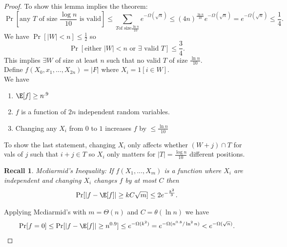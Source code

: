 \documentclass[a4paper]{article}
\newtheorem{rec}[thm]{Recall}
\begin{document}
\begin{proof}
    To show this lemma implies the theorem:
    \[
    \Pr\left [ \text{any $T$ of size $\frac{\log n}{10}$ is valid} \right ]\leq \sum_{T \text{of size} \frac{\ln n}{10}} e^{-\Omega(\sqrt{n})}\leq (4n)^{\frac{\ln n}{10}} e^{-\Omega(\sqrt{n})}=e^{-\Omega(\sqrt{n})}\leq \frac{1}{4}
    .\] 
    We have $\Pr[|W|<n]\leq \frac{1}{2}$ so 
    \[
    \Pr[ \text{either $|W|<n$ or $\exists$ valid $T$}]\leq \frac{3}{4}
    .\] 
    This implies $\exists W$ of size at least $n$ such that no valid $T$ of size $\frac{\ln n}{10}$.\\
    Define $f(X_0,x_1,...,X_{2n})=|F|$ where $X_i=1[i\in W]$. \\
    We have 
    \begin{enumerate}
        \item $\E[f]\geq n^{.9}$
        \item $f$ is a function of $2n$ independent random variables.
        \item Changing any $X_i$ from $0$ to $1$ increases $f$ by $\leq \frac{\ln n}{10}$
    \end{enumerate}
    To show the last statement, changing $X_i$ only affects whether $(W+j)\cap T$ for vals of $j$ such that $i+j\in T$ so $X_i$ only matters for $|T|= \frac{\log n}{10}$ different positions. 
    \begin{rec}
        Mcdiarmid's Inequality: If $f(X_1,...,X_m)$ is a function where $X_i$ are independent and changing $X_i$ changes $f$ by at most $C$ then 
        \[
        \Pr[|f-\E[f]|\geq kC\sqrt{m}]\leq 2e^{-\frac{k^2}{3}}
        .\] 
    \end{rec}
    Applying Mcdiarmid's with $m=\Theta(n)$ and $C=\theta(\ln n)$ we have 
    \[
    \Pr[f=0]\leq \Pr[|f-\E[f]|\geq n^{0.9}]\leq e^{-\Omega(k^2)}=e^{-\Omega(n^{0.8}/\ln^2 n)}<e^{-\Omega(\sqrt{n})}
    .\] 
\end{proof}
\end{document}
